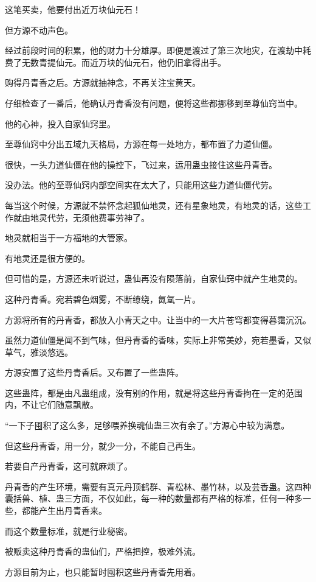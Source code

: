 \begin{this_body}
这笔买卖，他要付出近万块仙元石！

但方源不动声色。

经过前段时间的积累，他的财力十分雄厚。即便是渡过了第三次地灾，在渡劫中耗费了无数青提仙元。而近万块的仙元石，他仍旧拿得出手。

购得丹青香之后。方源就抽神念，不再关注宝黄天。

仔细检查了一番后，他确认丹青香没有问题，便将这些都挪移到至尊仙窍当中。

他的心神，投入自家仙窍里。

至尊仙窍中分出五域九天格局，方源在每一处地方，都布置了力道仙僵。

很快，一头力道仙僵在他的操控下，飞过来，运用蛊虫接住这些丹青香。

没办法。他的至尊仙窍内部空间实在太大了，只能用这些力道仙僵代劳。

每当这个时候，方源就不禁怀念起狐仙地灵，还有星象地灵，有地灵的话，这些工作就由地灵代劳，无须他费事劳神了。

地灵就相当于一方福地的大管家。

有地灵还是很方便的。

但可惜的是，方源还未听说过，蛊仙再没有陨落前，自家仙窍中就产生地灵的。

这种丹青香。宛若碧色烟雾，不断缭绕，氤氲一片。

方源将所有的丹青香，都放入小青天之中。让当中的一大片苍穹都变得暮霭沉沉。

虽然力道仙僵是闻不到气味，但丹青香的香味，实际上非常美妙，宛若墨香，又似草气，雅淡悠远。

方源安置了这些丹青香后。又布置了一些蛊阵。

这些蛊阵，都是由凡蛊组成，没有别的作用，就是将这些丹青香拘在一定的范围内，不让它们随意飘散。

“一下子囤积了这么多，足够喂养换魂仙蛊三次有余了。”方源心中较为满意。

但这些丹青香，用一分，就少一分，不能自己再生。

若要自产丹青香，这可就麻烦了。

丹青香的产生环境，需要有真元丹顶鹤群、青松林、墨竹林，以及芸香蛊。这四种囊括兽、植、蛊三方面，不仅如此，每一种的数量都有严格的标准，任何一种多一些，都能产生出丹青香来。

而这个数量标准，就是行业秘密。

被贩卖这种丹青香的蛊仙们，严格把控，极难外流。

方源目前为止，也只能暂时囤积这些丹青香先用着。


\end{this_body}
